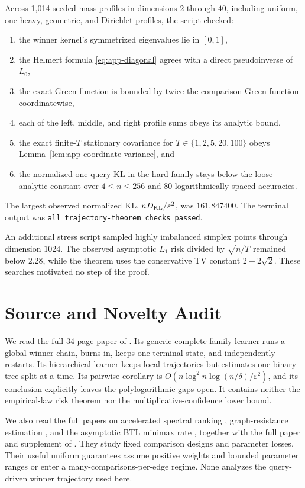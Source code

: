 \documentclass{article}
\begin{document}
Across 1,014 seeded mass profiles in dimensions $2$ through $40$, including
uniform, one-heavy, geometric, and Dirichlet profiles, the script checked:
\begin{enumerate}
\item the winner kernel's symmetrized eigenvalues lie in $[0,1]$,
\item the Helmert formula \eqref{eq:app-diagonal} agrees with a direct
pseudoinverse of $L_0$,
\item the exact Green function is bounded by twice the comparison Green
function coordinatewise,
\item each of the left, middle, and right profile sums obeys its analytic
bound,
\item the exact finite-$T$ stationary covariance for
$T\in\{1,2,5,20,100\}$ obeys
Lemma~\ref{lem:app-coordinate-variance}, and
\item the normalized one-query KL in the hard family stays below the loose
analytic constant over $4\le n\le256$ and 80 logarithmically spaced
accuracies.
\end{enumerate}
The largest observed normalized KL,
$nD_{\rm KL}/\varepsilon^2$, was $161.847400$. The terminal output was
\texttt{all trajectory-theorem checks passed}.

An additional stress script sampled highly imbalanced simplex points through
dimension $1024$. The observed asymptotic $L_1$ risk divided by
$\sqrt{n/T}$ remained below $2.28$, while the theorem uses the conservative
TV constant $2+2\sqrt2$. These searches motivated no step of the proof.

\section{Source and Novelty Audit}
\label{app:sources}

We read the full 34-page paper of \citet{kleinberg2026providers}. Its generic
complete-family learner runs a global winner chain, burns in, keeps one
terminal state, and independently restarts. Its hierarchical learner keeps
local trajectories but estimates one binary tree split at a time. Its
pairwise corollary is
$O(n\log^2n\log(n/\delta)/\varepsilon^2)$, and its conclusion explicitly
leaves the polylogarithmic gaps open. It contains neither the empirical-law
risk theorem nor the multiplicative-confidence lower bound.

We also read the full papers on accelerated spectral ranking
\citep{agarwal2018accelerated}, graph-resistance estimation
\citep{hendrickx2019resistance}, and the asymptotic BTL minimax rate
\citep{hendrickx2020minimax}, together with the full paper and supplement of
\citet{shah2015estimation}. They study fixed comparison designs and parameter
losses. Their useful uniform guarantees assume positive weights and bounded
parameter ranges or enter a many-comparisons-per-edge regime. None analyzes
the query-driven winner trajectory used here.
\end{document}
